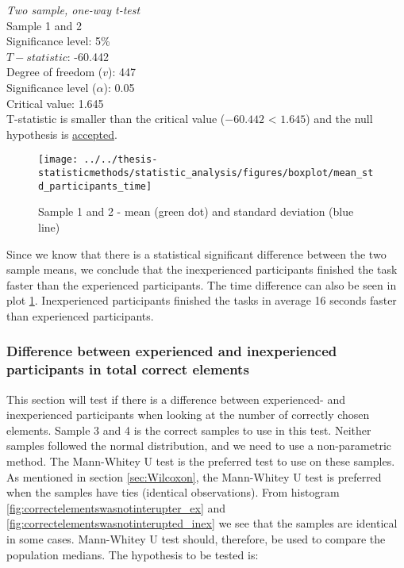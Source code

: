  \begin{center}
	\begin{tcolorbox}[width=0.8\textwidth]
		\centering
		\textit{Two sample, one-way t-test}\\
		Sample 1 and 2\\
		Significance level: 5\%  \\[0.5cm]
		
		$T-statistic$: -60.442 \\
		Degree of freedom ($v$): 447 \\ %
		Significance level ($\alpha$): 0.05 \\
		Critical value: 1.645\\[0.2cm]
		
		T-statistic is smaller than the critical value ($-60.442$ < $1.645$) and the null hypothesis is \underline{accepted}.\\[0.5cm]
	\end{tcolorbox} 
\end{center}

\begin{figure}[H]
	\centering
	\texttt{[image: ../../thesis-statisticmethods/statistic\_analysis/figures/boxplot/mean\_std\_participants\_time]}
	\caption{Sample 1 and 2 - mean (green dot) and standard deviation (blue line)}
	\label{fig:meanstdparticipantstime}
\end{figure}

Since we know that there is a statistical significant difference between the two sample means, we conclude that the inexperienced participants finished the task faster than the experienced participants. The time difference can also be seen in plot \ref{fig:meanstdparticipantstime}. Inexperienced participants finished the tasks in average 16 seconds faster than experienced participants.\newline

\subsubsection[Sample 3, 4]{Difference between experienced and inexperienced participants in total correct elements} %

This section will test if there is a difference between experienced- and inexperienced participants when looking at the number of correctly chosen elements. Sample 3 and 4 is the correct samples to use in this test. Neither samples followed the normal distribution, and we need to use a non-parametric method. The Mann-Whitey U test is the preferred test to use on these samples. As mentioned in section \ref{sec:Wilcoxon}, the Mann-Whitey U test is preferred when the samples have ties (identical observations). From histogram \ref{fig:correctelementswasnotinterupter_ex} and \ref{fig:correctelementswasnotinterupted_inex} we see that the samples are identical in some cases. Mann-Whitey U test should, therefore, be used to compare the population medians. The hypothesis to be tested is:\\[0.3cm]


